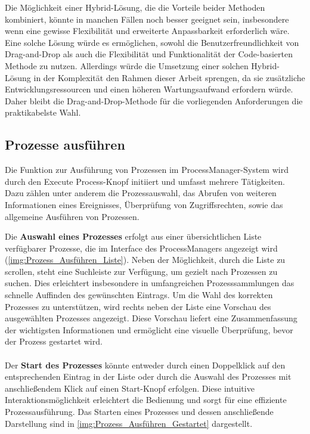 Die Möglichkeit einer Hybrid-Lösung, die die Vorteile beider Methoden kombiniert, könnte in manchen Fällen noch besser geeignet sein, insbesondere wenn eine gewisse Flexibilität und erweiterte Anpassbarkeit erforderlich wäre. Eine solche Lösung würde es ermöglichen, sowohl die Benutzerfreundlichkeit von Drag-and-Drop als auch die Flexibilität und Funktionalität der Code-basierten Methode zu nutzen. Allerdings würde die Umsetzung einer solchen Hybrid-Lösung in der Komplexität den Rahmen dieser Arbeit sprengen, da sie zusätzliche Entwicklungsressourcen und einen höheren Wartungsaufwand erfordern würde. Daher bleibt die Drag-and-Drop-Methode für die vorliegenden Anforderungen die praktikabelste Wahl.


\subsection*{Prozesse ausführen}
Die Funktion zur Ausführung von Prozessen im ProcessManager-System wird durch den \glqq Execute Process\grqq{}-Knopf initiiert und umfasst mehrere Tätigkeiten. Dazu zählen unter anderem die Prozessauswahl, das Abrufen von weiteren Informationen eines Ereignisses, Überprüfung von Zugriffsrechten, sowie das allgemeine Ausführen von Prozessen.

Die \textbf{Auswahl eines Prozesses} erfolgt aus einer übersichtlichen Liste verfügbarer Prozesse, die im Interface des ProcessManagers angezeigt wird (\ref{img:Prozess_Ausführen_Liste}). Neben der Möglichkeit, durch die Liste zu scrollen, steht eine Suchleiste zur Verfügung, um gezielt nach Prozessen zu suchen. Dies erleichtert insbesondere in umfangreichen Prozesssammlungen das schnelle Auffinden des gewünschten Eintrags. Um die Wahl des korrekten Prozesses zu unterstützen, wird rechts neben der Liste eine Vorschau des ausgewählten Prozesses angezeigt. Diese Vorschau liefert eine Zusammenfassung der wichtigsten Informationen und ermöglicht eine visuelle Überprüfung, bevor der Prozess gestartet wird.\\
\\
\newpage
Der \textbf{Start des Prozesses} könnte entweder durch einen Doppelklick auf den entsprechenden Eintrag in der Liste oder durch die Auswahl des Prozesses mit anschließendem Klick auf einen Start-Knopf erfolgen. Diese intuitive Interaktionsmöglichkeit erleichtert die Bedienung und sorgt für eine effiziente Prozessausführung. Das Starten eines Prozesses und dessen anschließende Darstellung sind in \autoref{img:Prozess_Ausführen_Gestartet} dargestellt.\\
\\

